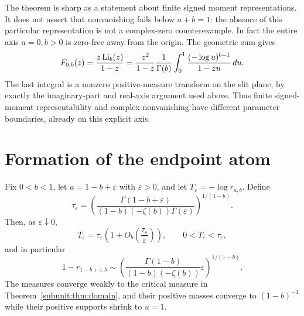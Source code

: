 The theorem is sharp as a statement about finite signed moment
representations. It does not assert that nonvanishing fails below
$a+b=1$: the absence of this particular representation is not a
complex-zero counterexample. In fact the entire axis $a=0,b>0$ is zero-free away from the origin.
The geometric sum gives
\[
 F_{0,b}(z)=\frac{z\operatorname{Li}_b(z)}{1-z}
 =\frac{z^2}{1-z}\frac1{\Gamma(b)}
       \int_0^1\frac{(-\log u)^{b-1}}{1-zu}\,du.
\]
The last integral is a nonzero positive-measure transform on the slit
plane, by exactly the imaginary-part and real-axis argument used above.
Thus finite signed-moment representability and complex nonvanishing
have different parameter boundaries, already on this explicit axis.

\section{Formation of the endpoint atom}

\begin{theorem}
\label{subunit:thm:boundarylayer}
Fix $0<b<1$, let $a=1-b+\varepsilon$ with $\varepsilon>0$, and
let $T_\varepsilon=-\log r_{a,b}$. Define
\[
 \tau_\varepsilon=
 \left(\frac{\Gamma(1-b+\varepsilon)}
 {(1-b)(-\zeta(b))\Gamma(\varepsilon)}\right)^{1/(1-b)}.
\]
Then, as $\varepsilon\downarrow0$,
\begin{equation}\label{subunit:eq:layerexact}
 T_\varepsilon=\tau_\varepsilon
 \left(1+O_b\left(\frac{\tau_\varepsilon}{\varepsilon}\right)\right),
 \qquad 0<T_\varepsilon<\tau_\varepsilon,
\end{equation}
and in particular
\begin{equation}\label{subunit:eq:layerleading}
 1-r_{1-b+\varepsilon,b}\sim
 \left(\frac{\Gamma(1-b)}{(1-b)(-\zeta(b))}
       \varepsilon\right)^{1/(1-b)}.
\end{equation}
The measures converge weakly to the critical measure in
Theorem~\ref{subunit:thm:domain}, and their positive masses converge
to $(1-b)^{-1}$ while their positive supports shrink to $u=1$.
\end{theorem}

